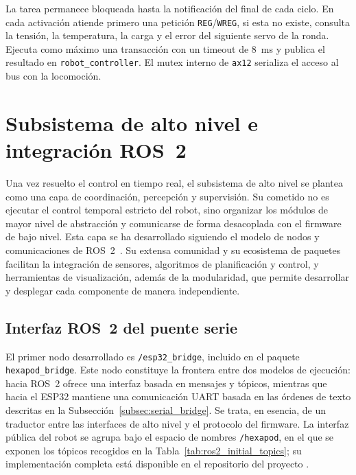 La tarea permanece bloqueada hasta la notificación del final de cada ciclo. En
cada activación atiende primero una petición \texttt{REG}/\texttt{WREG}, si esta no
existe, consulta la tensión, la temperatura, la carga y el error del siguiente
servo de la ronda. Ejecuta como máximo una transacción con un timeout
de 8~ms y publica el resultado en \texttt{robot\_controller}. El mutex interno
de \texttt{ax12} serializa el acceso al bus con la locomoción.

\newpage
\section{Subsistema de alto nivel e integración ROS~2}
\label{sec:integracion_ros2}

Una vez resuelto el control en tiempo real, el subsistema de alto
nivel se plantea como una capa de coordinación, percepción y supervisión. Su cometido
no es ejecutar el control temporal estricto del robot, sino organizar los módulos de
mayor nivel de abstracción y comunicarse de forma desacoplada con el firmware de bajo
nivel. Esta capa se ha desarrollado siguiendo el modelo de
nodos y comunicaciones de ROS~2~\cite{ros2_docs}. Su extensa comunidad y su ecosistema
de paquetes facilitan la integración de sensores, algoritmos de planificación y
control, y herramientas de visualización, además de la modularidad, que permite desarrollar y desplegar cada componente de manera independiente.

\subsection{Interfaz ROS~2 del puente serie}
\label{subsec:ros2_nodes_topics}
\label{subsec:esp32_bridge_ros2}

El primer nodo desarrollado es \texttt{/esp32\_bridge}, incluido en el paquete
\texttt{hexapod\_bridge}. Este nodo constituye la frontera entre dos modelos de
ejecución: hacia ROS~2 ofrece una interfaz basada en mensajes y tópicos, mientras que
hacia el ESP32 mantiene una comunicación UART basada en las órdenes de texto
descritas en la Subsección~\ref{subsec:serial_bridge}. Se trata, en esencia, de un
traductor entre las interfaces de alto nivel y el protocolo del firmware. La interfaz
pública del robot se agrupa bajo el espacio de nombres \texttt{/hexapod}, en el que
se exponen los tópicos recogidos en la Tabla~\ref{tab:ros2_initial_topics}; su
implementación completa está disponible en el repositorio del proyecto
\cite{repositorio_hexapodo}.

